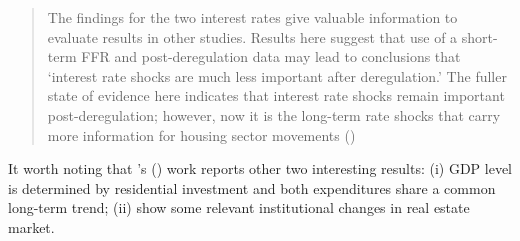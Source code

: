 \documentclass[11pt]{article}
\begin{document}
\begin{quote}
The findings for the two interest rates give valuable information to evaluate results in other studies. Results here suggest that use of a short-term FFR and post-deregulation data may lead to conclusions that `interest rate shocks are much less important after deregulation.' The fuller state of evidence here indicates that interest rate shocks remain important post-deregulation; however, now it is the long-term rate shocks that carry more information for housing sector movements (\cite[p.~346]{gauger_residential_2003})
\end{quote}
It worth noting that \citeauthor{gauger_residential_2003}'s (\citeyear{gauger_residential_2003}) work reports other two interesting results:
	(i) GDP level is determined by residential investment and both expenditures share a common long-term trend;
	(ii) show some relevant institutional changes in real estate market.
\end{document}
